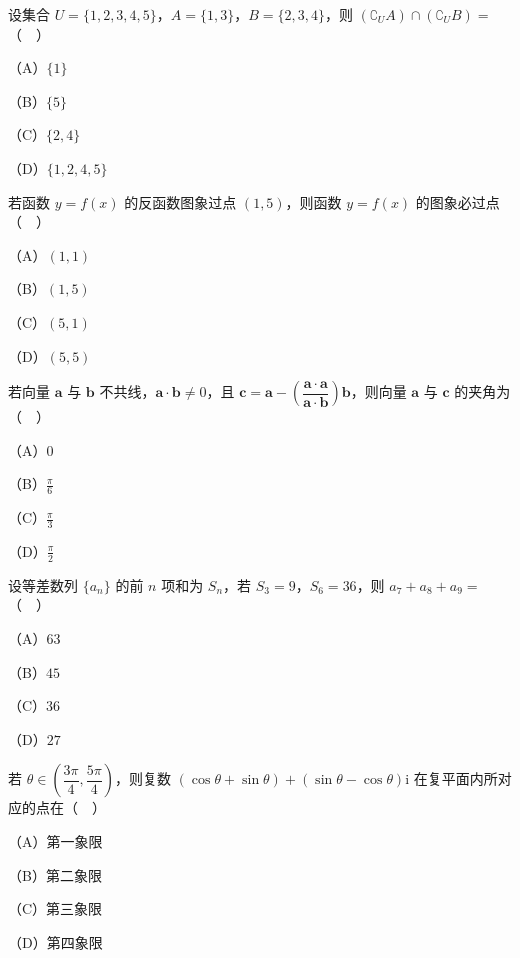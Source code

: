 


\begin{question}
设集合 $U=\{1,2,3,4,5\}$，$A=\{1,3\}$，$B=\{2,3,4\}$，则 $(\complement_UA)\cap(\complement_UB)=$（　）

（A）$\{1\}$

（B）$\{5\}$

（C）$\{2,4\}$

（D）$\{1,2,4,5\}$

\end{question}
\begin{question}
若函数 $y=f(x)$ 的反函数图象过点 $(1,5)$，则函数 $y=f(x)$ 的图象必过点（　）

（A）$(1,1)$

（B）$(1,5)$

（C）$(5,1)$

（D）$(5,5)$

\end{question}
\begin{question}
若向量 $\boldsymbol a$ 与 $\boldsymbol b$ 不共线，$\boldsymbol a\cdot\boldsymbol b\neq0$，且 $\boldsymbol c=\boldsymbol a-\left(\dfrac{\boldsymbol a\cdot\boldsymbol a}{\boldsymbol a\cdot\boldsymbol b}\right)\boldsymbol b$，则向量 $\boldsymbol a$ 与 $\boldsymbol c$ 的夹角为（　）

（A）$0$

（B）$\frac{\pi}{6}$

（C）$\frac{\pi}{3}$

（D）$\frac{\pi}{2}$

\end{question}
\begin{question}
设等差数列 $\{a_n\}$ 的前 $n$ 项和为 $S_n$，若 $S_3=9$，$S_6=36$，则 $a_7+a_8+a_9=$（　）

（A）$63$

（B）$45$

（C）$36$

（D）$27$

\end{question}
\begin{question}
若 $\theta\in\left(\dfrac{3\pi}{4},\dfrac{5\pi}{4}\right)$，则复数 $(\cos\theta+\sin\theta)+(\sin\theta-\cos\theta)\mathrm i$ 在复平面内所对应的点在（　）

（A）第一象限

（B）第二象限

（C）第三象限

（D）第四象限

\end{question}
